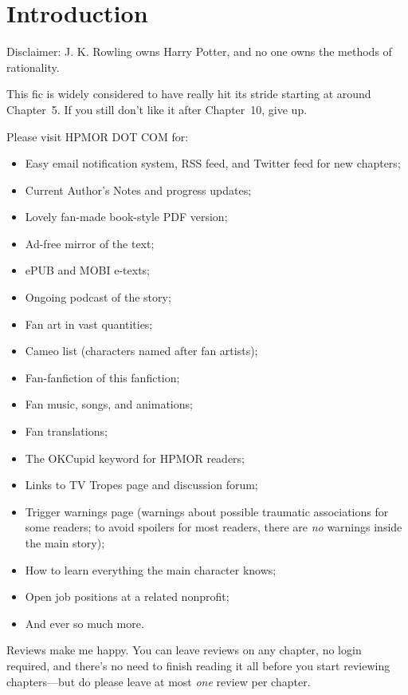 \chapter{Introduction}
Disclaimer: J. K. Rowling owns Harry Potter, and no one owns the methods of
rationality.

This fic is widely considered to have really hit its stride starting at around
Chapter~5. If you still don't like it after Chapter~10,\linebreak{} give up.

\SmallVSpace
Please visit HPMOR DOT COM for:

\SmallVSpace
\begin{itemize}
    \item Easy email notification system, RSS feed, and Twitter feed for new chapters;
    \item Current Author's Notes and progress updates;
    \item Lovely fan-made book-style PDF version;
    \item Ad-free mirror of the text;
    \item ePUB and MOBI e-texts;
    \item Ongoing podcast of the story;
    \item Fan art in vast quantities;
    \item Cameo list (characters named after fan artists);
    \item Fan-fanfiction of this fanfiction;
    \item Fan music, songs, and animations;
    \item Fan translations;
    \item The OKCupid keyword for HPMOR readers;
    \item Links to TV Tropes page and discussion forum;
    \item Trigger warnings page (warnings about possible traumatic associations
        for some readers; to avoid spoilers for most readers, there are
        \emph{no} warnings inside the main story);
        \pagebreak
    \item How to learn everything the main character knows;
    \item Open job positions at a related nonprofit;
    \item And ever so much more.
\end{itemize}

\SmallVSpace
Reviews make me happy. You can leave reviews on any chapter, no login required,
and there's no need to finish reading it all before you start reviewing
chapters---but do please leave at most \emph{one} review per chapter.

